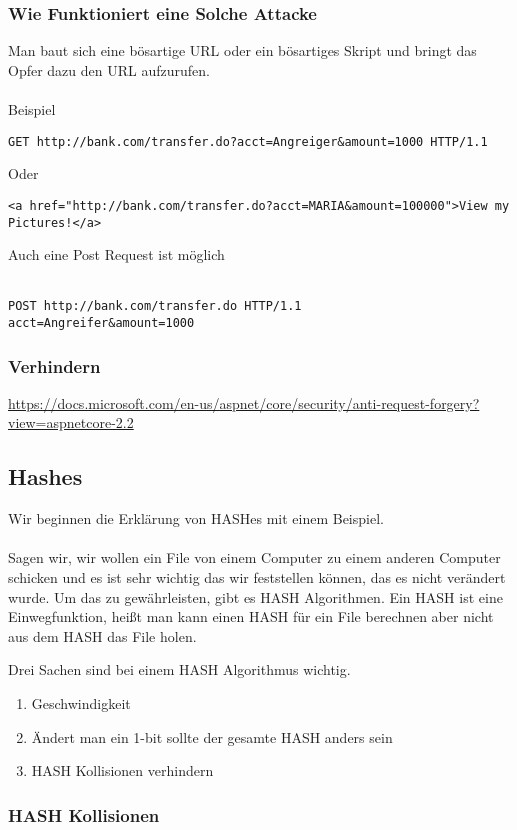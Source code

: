 {\subsubsection{Wie Funktioniert eine Solche Attacke}
Man baut sich eine bösartige URL oder ein bösartiges Skript und bringt das Opfer dazu den URL aufzurufen. 
\\ \\
Beispiel
\begin{lstlisting}
GET http://bank.com/transfer.do?acct=Angreiger&amount=1000 HTTP/1.1
\end{lstlisting}
Oder
\begin{lstlisting}
<a href="http://bank.com/transfer.do?acct=MARIA&amount=100000">View my Pictures!</a>
\end{lstlisting}
Auch eine Post Request ist möglich
\\ \\
\begin{lstlisting}
POST http://bank.com/transfer.do HTTP/1.1
acct=Angreifer&amount=1000
\end{lstlisting}
\subsubsection{Verhindern}
\url{https://docs.microsoft.com/en-us/aspnet/core/security/anti-request-forgery?view=aspnetcore-2.2}
\subsection{Hashes}
\label{hash-expl}
Wir beginnen die Erklärung von HASHes mit einem Beispiel.
\\ \\
Sagen wir, wir wollen ein File von einem Computer zu einem anderen Computer schicken und es ist sehr wichtig das wir feststellen können, das es nicht verändert wurde. Um das zu gewährleisten, gibt es HASH Algorithmen. Ein HASH ist eine Einwegfunktion, heißt man kann einen HASH für ein File berechnen aber nicht aus dem HASH das File holen. 

Drei Sachen sind bei einem HASH Algorithmus wichtig.
\begin{enumerate}
\item Geschwindigkeit
\item Ändert man ein 1-bit sollte der gesamte HASH anders sein
\item HASH Kollisionen verhindern 
\end{enumerate}

\subsubsection{HASH Kollisionen}

}
